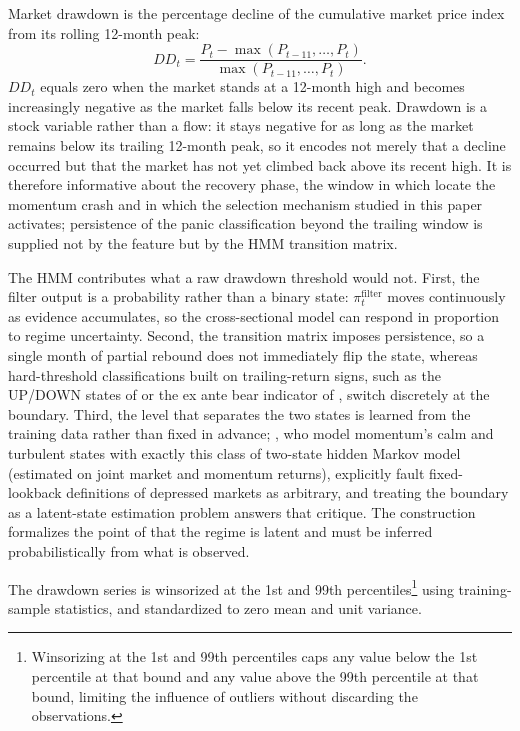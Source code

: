 Market drawdown is the percentage decline of the cumulative market price index from its rolling 12-month peak:
\begin{equation}
    DD_t = \frac{P_t - \max(P_{t-11}, \dots, P_t)}{\max(P_{t-11}, \dots, P_t)}.
\end{equation}
$DD_t$ equals zero when the market stands at a 12-month high and becomes increasingly negative as the market falls below its recent peak. Drawdown is a stock variable rather than a flow: it stays negative for as long as the market remains below its trailing 12-month peak, so it encodes not merely that a decline occurred but that the market has not yet climbed back above its recent high. It is therefore informative about the recovery phase, the window in which \citet{DanielMoskowitz2016} locate the momentum crash and in which the selection mechanism studied in this paper activates; persistence of the panic classification beyond the trailing window is supplied not by the feature but by the HMM transition matrix.

The HMM contributes what a raw drawdown threshold would not. First, the filter output is a probability rather than a binary state: $\pi_t^{\text{filter}}$ moves continuously as evidence accumulates, so the cross-sectional model can respond in proportion to regime uncertainty. Second, the transition matrix imposes persistence, so a single month of partial rebound does not immediately flip the state, whereas hard-threshold classifications built on trailing-return signs, such as the UP/DOWN states of \citet{Cooper2004} or the ex ante bear indicator of \citet{DanielMoskowitz2016}, switch discretely at the boundary. Third, the level that separates the two states is learned from the training data rather than fixed in advance; \citet{DanielJagannathanKim2019}, who model momentum's calm and turbulent states with exactly this class of two-state hidden Markov model (estimated on joint market and momentum returns), explicitly fault fixed-lookback definitions of depressed markets as arbitrary, and treating the boundary as a latent-state estimation problem answers that critique. The construction formalizes the point of \citet{Hamilton1989} that the regime is latent and must be inferred probabilistically from what is observed.

The drawdown series is winsorized at the 1st and 99th percentiles\footnote{Winsorizing at the 1st and 99th percentiles caps any value below the 1st percentile at that bound and any value above the 99th percentile at that bound, limiting the influence of outliers without discarding the observations.} using training-sample statistics, and standardized to zero mean and unit variance.

